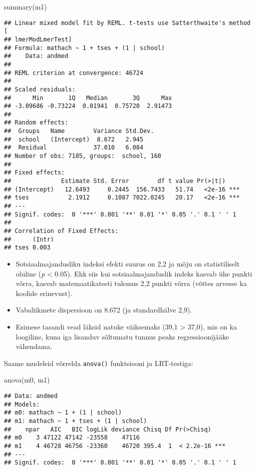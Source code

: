 \documentclass[
]{book}
\newenvironment{Shaded}{\begin{snugshade}}{\end{snugshade}}
\newcommand{\FunctionTok}[1]{\textcolor[rgb]{0.00,0.00,0.00}{#1}}
\newcommand{\NormalTok}[1]{#1}
\providecommand{\tightlist}{%
  \setlength{\itemsep}{0pt}\setlength{\parskip}{0pt}}
\begin{document}
\begin{Shaded}
\begin{Highlighting}[]
\FunctionTok{summary}\NormalTok{(m1)}
\end{Highlighting}
\end{Shaded}

\begin{verbatim}
## Linear mixed model fit by REML. t-tests use Satterthwaite's method [
## lmerModLmerTest]
## Formula: mathach ~ 1 + tses + (1 | school)
##    Data: andmed
## 
## REML criterion at convergence: 46724
## 
## Scaled residuals: 
##      Min       1Q   Median       3Q      Max 
## -3.09686 -0.73224  0.01941  0.75720  2.91473 
## 
## Random effects:
##  Groups   Name        Variance Std.Dev.
##  school   (Intercept)  8.672   2.945   
##  Residual             37.010   6.084   
## Number of obs: 7185, groups:  school, 160
## 
## Fixed effects:
##              Estimate Std. Error        df t value Pr(>|t|)    
## (Intercept)   12.6493     0.2445  156.7433   51.74   <2e-16 ***
## tses           2.1912     0.1087 7022.0245   20.17   <2e-16 ***
## ---
## Signif. codes:  0 '***' 0.001 '**' 0.01 '*' 0.05 '.' 0.1 ' ' 1
## 
## Correlation of Fixed Effects:
##      (Intr)
## tses 0.003
\end{verbatim}

\begin{itemize}
\tightlist
\item
  Sotsiaalmajandusliku indeksi efekti suurus on 2,2 ja mõju on statistiliselt oluline (\emph{p} \textless{} 0.05). Ehk siis kui sotsiaalmajanduslik indeks kasvab ühe punkti võrra, kasvab matemaatikatesti tulemus 2,2 punkti võrra (võttes arvesse ka koolide erinevust).
\item
  Vabaliikmete dispersioon on 8.672 (ja standardhälve 2,9).
\item
  Esimese tasandi vead läksid natuke väiksemaks (39,1 \textgreater{} 37,0), mis on ka loogiline, kuna iga lisanduv sõltumatu tunnus peaks regressioonijääke vähendama.
\end{itemize}

Saame mudeleid võrrelda \texttt{anova()} funktsiooni ja LRT-testiga:

\begin{Shaded}
\begin{Highlighting}[]
\FunctionTok{anova}\NormalTok{(m0, m1)}
\end{Highlighting}
\end{Shaded}

\begin{verbatim}
## Data: andmed
## Models:
## m0: mathach ~ 1 + (1 | school)
## m1: mathach ~ 1 + tses + (1 | school)
##    npar   AIC   BIC logLik deviance Chisq Df Pr(>Chisq)    
## m0    3 47122 47142 -23558    47116                        
## m1    4 46728 46756 -23360    46720 395.4  1  < 2.2e-16 ***
## ---
## Signif. codes:  0 '***' 0.001 '**' 0.01 '*' 0.05 '.' 0.1 ' ' 1
\end{verbatim}
\end{document}
